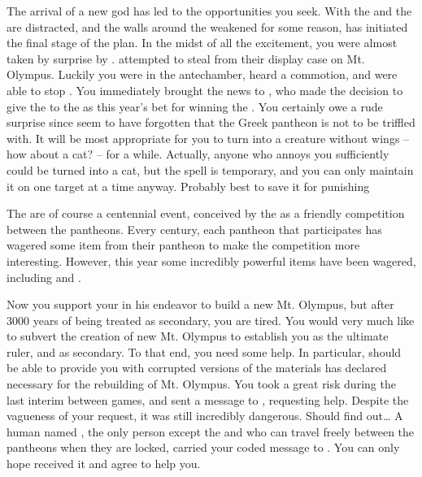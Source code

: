 \documentclass[char]{guardians}
\begin{document}
The arrival of a new god has led to the opportunities you seek. With the \cCaretaker{} and the \cWarden{} are distracted, and the walls around the \stone{} weakened for some reason, \cZeus{} has initiated the final stage of the plan. In the midst of all the excitement, you were almost taken by surprise by \cVal{}. \cVal{} attempted to steal \iSandals{\MYname} from their display case on Mt. Olympus. Luckily you were in the antechamber, heard a commotion, and were able to stop \cVal{\them}. You immediately brought the news to \cZeus{}, who made the decision to give the \iSandals{\MYname} to the \cCaretaker{} as this year's bet for winning the \pGames{}. You certainly owe \cVal{} a rude surprise since \cVal{\they} seem to have forgotten that the Greek pantheon is not to be triffled with. It will be most appropriate for you to turn \cVal{\them} into a creature without wings -- how about a cat? -- for a while. Actually, anyone who annoys you sufficiently could be turned into a cat, but the spell is temporary, and you can only maintain it on one target at a time anyway. Probably best to save it for punishing \cVal{}

The \pGames{} are of course a centennial event, conceived by the \cCaretaker{} as a friendly competition between the pantheons. Every century, each pantheon that participates has wagered some item from their pantheon to make the competition more interesting. However, this year some incredibly powerful items have been wagered, including \iSandals{\MYname} and \iHammer{\MYname}.

Now you support your \cZeus{\spouse} in his endeavor to build a new Mt. Olympus, but after 3000 years of being treated as secondary, you are tired.  You would very much like to subvert the creation of  new Mt. Olympus to establish you as the ultimate ruler, and \cZeus{} as secondary.  To that end, you need some help. In particular, \cOsiris{} should be able to provide you with corrupted versions of the materials \cHephaestus{} has declared necessary for the rebuilding of Mt. Olympus. You took a great risk during the last interim between games, and sent a message to \cOsiris{}, requesting \cOsiris{\their} help. Despite the vagueness of your request, it was still incredibly dangerous. Should \cZeus{} find out\ldots{} A human named \cJascha{}, the only person except the \cCaretaker{} and \cWarden{} who can travel freely between the pantheons when they are locked, carried your coded message to \cOsiris{}. You can only hope \cOsiris{\they} received it and agree to help you.
\end{document}
